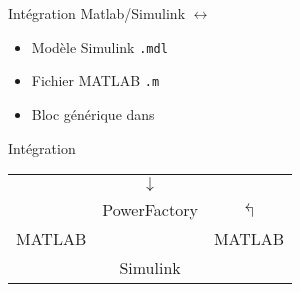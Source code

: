 \begin{frame}{Intégration}
	Matlab/Simulink $ \leftrightarrow $ \powerfactory\pause
	\begin{itemize}
		\item Modèle Simulink \texttt{.mdl}\pause
		\item Fichier MATLAB \texttt{.m}\pause
		\item Bloc générique dans \powerfactory\  
	\end{itemize}
\end{frame}
\begin{frame}{Intégration}
\centering
\begin{tabular}{ccc}
	&$ \downarrow $&\\
	\rotatebox[origin=c]{90}{ $ \Lsh $} & PowerFactory &$ \Lsh $ \\ 
	MATLAB&  &MATLAB  \\ 
	 \rotatebox[origin=c]{180}{ $ \Lsh $}  &Simulink&\rotatebox[origin=c]{270}{ $ \Lsh $} 
\end{tabular} 
\end{frame}
